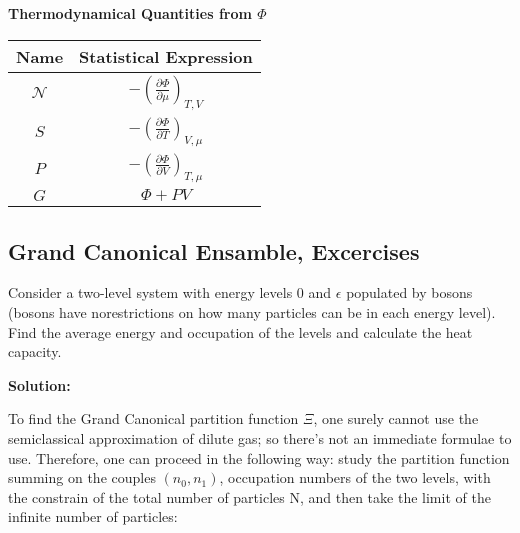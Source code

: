 \documentclass{article}
\begin{document}
\begin{tcolorbox}[colframe=gray!90, colback=gray!5, coltitle=white, sharp corners, title=\textbf{Grand Canonical Ensamble, Summary}, fonttitle=\large\bfseries]
    \vspace{0.3cm}
    \textbf{Thermodynamical Quantities from \(\Phi \)}

    \begin{center}
        \begin{tabular}{|c|c|}
            \hline
            \textbf{Name}     & \textbf{Statistical Expression}                                \\ \hline
            \( \mathcal{N} \) & \( -\left( \frac{\partial \Phi}{\partial \mu} \right)_{T,V} \) \\ \hline
            \( S \)           & \( -\left( \frac{\partial \Phi}{\partial T} \right)_{V,\mu} \) \\ \hline
            \( P \)           & \( -\left( \frac{\partial \Phi}{\partial V} \right)_{T,\mu} \) \\ \hline
            \( G \)           & \( \Phi + PV \)                                                \\ \hline
        \end{tabular}
    \end{center}

\end{tcolorbox}
\newpage


\subsection{Grand Canonical Ensamble, Excercises}

\begin{tcolorbox}[colframe=orange!60, colback=gray!5, coltitle=black, title=\textbf{Kennett, 6.4}, fonttitle=\large\bfseries]

    Consider a two-level system with energy levels 0 and $\epsilon$ populated by bosons (bosons
    have norestrictions on how many particles can be in each energy level). Find the
    average energy and occupation of the levels and calculate the heat capacity.

\end{tcolorbox}

\textbf{Solution:}

To find the Grand Canonical partition function $\Xi$, one surely cannot use the semiclassical approximation
of dilute gas; so there's not an immediate formulae to use.
Therefore, one can proceed in the following way: study the partition function
summing on the couples $(n_0, n_1)$, occupation numbers of the two levels, with the constrain
of the total number of particles N, and then take the limit of the infinite number of particles:
\end{document}
